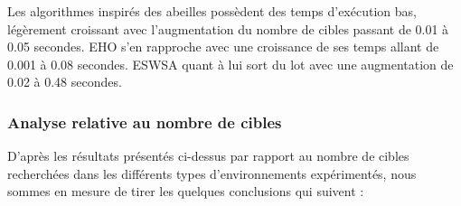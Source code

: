 	Les algorithmes inspirés des abeilles possèdent des temps d'exécution bas, légèrement croissant avec l'augmentation du nombre de cibles passant de 0.01 à 0.05 secondes. EHO s'en rapproche avec une croissance de ses temps allant de 0.001 à 0.08 secondes. ESWSA quant à lui sort du lot avec une augmentation de 0.02 à 0.48 secondes.
	
	\noindent
	\begin{minipage}[t]{0.54\textwidth}
		\captionsetup{width=0.8\linewidth}
		\centering{}
		\label{INc}
	\end{minipage}\hfill
	\hspace{-0.5cm}
	\begin{minipage}[t]{0.54\textwidth}
		\captionsetup{width=0.8\linewidth}
		\centering{}
		\label{tNc}
	\end{minipage}\hfill
	
	
	
	\subsubsection{Analyse relative au nombre de cibles}
	D'après les résultats présentés ci-dessus par rapport au nombre de cibles recherchées dans les différents types d'environnements expérimentés, nous sommes en mesure de tirer les quelques conclusions qui suivent :
	
